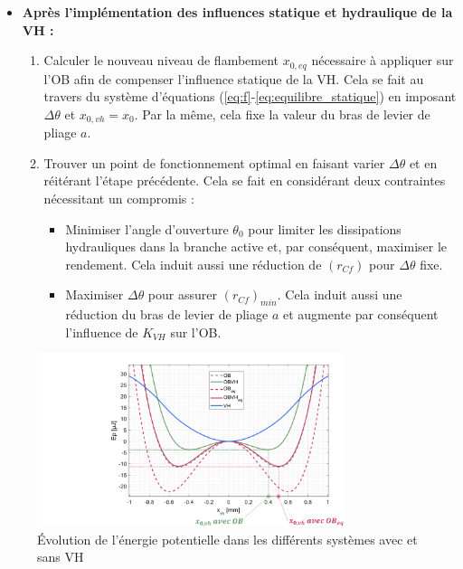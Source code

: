\begin{itemize}[label=$\circ$]
	\item \textbf{Après l'implémentation des influences statique et hydraulique de la VH :}
	      \begin{enumerate}
		      \item Calculer le nouveau niveau de flambement $x_{0,eq}$ nécessaire à appliquer sur l'OB afin de compenser l'influence statique de la VH. Cela se fait au travers du système d'équations (\ref{eq:f}-\ref{eq:equilibre_statique}) en imposant $\Delta\theta$ et $x_{0,vh} = x_0$. Par la même, cela fixe la valeur du bras de levier de pliage $a$.
		      \item Trouver un point de fonctionnement optimal en faisant varier $\Delta\theta$ et en réitérant l'étape précédente. Cela se fait en considérant deux contraintes nécessitant un compromis :
		            \begin{itemize}[label=$\bullet$]
			            \item Minimiser l'angle d'ouverture $\theta_0$ pour limiter les dissipations hydrauliques dans la branche active et, par conséquent, maximiser le rendement. Cela induit aussi une réduction de $(r_{Cf})$ pour $\Delta\theta$ fixe.
			            \item Maximiser $\Delta\theta$ pour assurer $(r_{Cf})_{min}$. Cela induit aussi une réduction du bras de levier de pliage $a$ et augmente par conséquent l'influence de $K_{VH}$ sur l'OB.
		            \end{itemize}
	      \end{enumerate}
\end{itemize}	
\begin{figure}[!htbp]
\begin{center}
		\captionsetup{justification=centering} 
		\includegraphics[trim={8cm 0cm 0cm 1cm},clip,width=0.8\textwidth]{../Chap6/Figure/Energie_potentielle_OBVHeq.pdf}
		\caption{Évolution de l'énergie potentielle dans les différents systèmes avec et sans VH}
		\label{fig:Evolution energie potentielle tous les systemes}
\end{center}	
\end{figure} 
